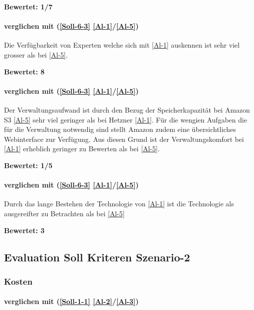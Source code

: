\textbf{Bewertet: 1/7}

\paragraph*{  verglichen mit  (\ref{Soll-6-3} \ref{Al-1}/\ref{Al-5})} 
Die Verfügbarkeit von Experten welche sich mit \ref{Al-1} auskennen ist sehr viel grosser als bei \ref{Al-5}.  

\textbf{Bewertet: 8}


\paragraph*{  verglichen mit  (\ref{Soll-6-3} \ref{Al-1}/\ref{Al-5})} 
Der Verwaltungsaufwand ist durch den Bezug der Speicherkapazität bei Amazon S3 \ref{Al-5} sehr viel geringer als bei Hetzner \ref{Al-1}.  Für die wengien Aufgaben die für die Verwaltung notwendig sind stellt Amazon zudem eine übersichtliches Webinterface zur Verfügung.
Aus diesen Grund ist der Verwaltungskomfort bei \ref{Al-1} erheblich geringer zu Bewerten als bei \ref{Al-5}.

\textbf{Bewertet: 1/5}

\paragraph*{  verglichen mit  (\ref{Soll-6-3} \ref{Al-1}/\ref{Al-5})} 
Durch das lange Bestehen der Technologie von \ref{Al-1} ist die Technologie als ausgereifter zu Betrachten als bei \ref{Al-5}

\textbf{Bewertet: 3}


\subsection{Evaluation Soll Kriteren Szenario-2}

\subsubsection{Kosten}

\paragraph*{  verglichen mit  (\ref{Soll-1-1} \ref{Al-2}/\ref{Al-3})}

